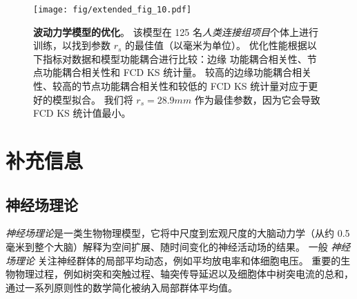 \documentclass[lang=cn,a4paper,newtx]{elegantpaper}
\begin{document}
\begin{figure}[!htb] 
	\centering
	\texttt{[image: fig/extended\_fig\_10.pdf]}
	\caption{\textbf{波动力学模型的优化}。
	该模型在 125 名\textit{人类连接组项目}个体上进行训练，以找到参数 $ r_s $ 的最佳值（以毫米为单位）。
	优化性能根据以下指标对数据和模型功能耦合进行比较：边缘 功能耦合相关性、节点功能耦合相关性和 FCD KS 统计量。
	较高的边缘功能耦合相关性、较高的节点功能耦合相关性和较低的 FCD KS 统计量对应于更好的模型拟合。
	我们将 $ r_s = 28.9 mm $ 作为最佳参数，因为它会导致 FCD KS 统计值最小。}
	\label{fig:extended_fig_10}
\end{figure}



\section{补充信息}

\subsection{神经场理论} \label{sec:NFT}

\textit{神经场理论}是一类生物物理模型，它将中尺度到宏观尺度的大脑动力学（从约 0.5 毫米到整个大脑）解释为空间扩展、随时间变化的神经活动场的结果\cite{beurle1956properties,da1976models,wright1995simulation,deco2008dynamic,jirsa1996field,robinson1997propagation,robinson2005multiscale}。
一般 \textit{神经场理论} 关注神经群体的局部平均动态，例如平均放电率和体细胞电压。
重要的生物物理过程，例如树突和突触过程、轴突传导延迟以及细胞体中树突电流的总和，通过一系列原则性的数学简化被纳入局部群体平均值。
\end{document}
